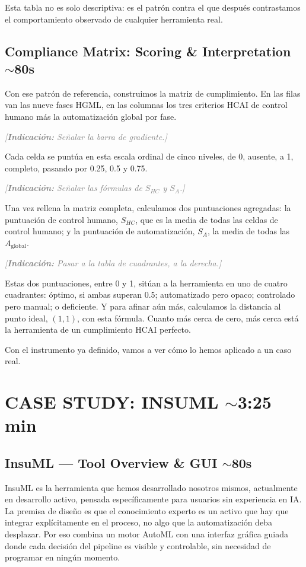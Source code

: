 \documentclass[11pt,a4paper]{article}
\newcommand{\indicacion}[1]{%
    \par\medskip
    \noindent\textcolor{gray}{\textit{[\textbf{Indicaci\'on:} #1]}}
    \par\medskip
}
\begin{document}
Esta tabla no es solo descriptiva: es el patrón contra el que después contrastamos el comportamiento observado de cualquier herramienta real.

\subsection{Compliance Matrix: Scoring \& Interpretation \hfill \normalfont\small $\sim$80s}
Con ese patrón de referencia, construimos la matriz de cumplimiento. En las filas van las nueve fases HGML, en las columnas los tres criterios HCAI de control humano más la automatización global por fase.

\indicacion{Señalar la barra de gradiente.}
Cada celda se puntúa en esta escala ordinal de cinco niveles, de 0, ausente, a 1, completo, pasando por 0.25, 0.5 y 0.75.

\indicacion{Señalar las fórmulas de $S_{HC}$ y $S_A$.}
Una vez rellena la matriz completa, calculamos dos puntuaciones agregadas: la puntuación de control humano, $S_{HC}$, que es la media de todas las celdas de control humano; y la puntuación de automatización, $S_A$, la media de todas las $A_{\text{global}}$.

\indicacion{Pasar a la tabla de cuadrantes, a la derecha.}
Estas dos puntuaciones, entre 0 y 1, sitúan a la herramienta en uno de cuatro cuadrantes: óptimo, si ambas superan 0.5; automatizado pero opaco; controlado pero manual; o deficiente. Y para afinar aún más, calculamos la distancia al punto ideal, $(1,1)$, con esta fórmula. Cuanto más cerca de cero, más cerca está la herramienta de un cumplimiento HCAI perfecto.

Con el instrumento ya definido, vamos a ver cómo lo hemos aplicado a un caso real.

\section{CASE STUDY: INSUML \hfill \normalfont\small $\sim$3:25 min}

\subsection{InsuML --- Tool Overview \& GUI \hfill \normalfont\small $\sim$80s}
InsuML es la herramienta que hemos desarrollado nosotros mismos, actualmente en desarrollo activo, pensada específicamente para usuarios sin experiencia en IA. La premisa de diseño es que el conocimiento experto es un activo que hay que integrar explícitamente en el proceso, no algo que la automatización deba desplazar. Por eso combina un motor AutoML con una interfaz gráfica guiada donde cada decisión del pipeline es visible y controlable, sin necesidad de programar en ningún momento.
\end{document}
